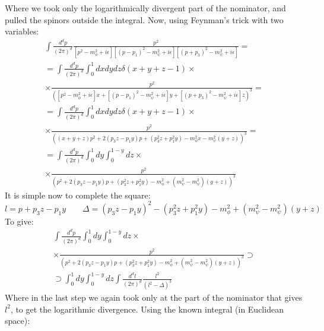 \documentclass{article}
\begin{document}
Where we took only the logarithmically divergent part of the nominator, and pulled the spinors outside the integral. Now, using Feynman's trick with two variables:
\begin{equation}
\begin{gathered}
    \int \frac{d^dp}{(2\pi)^d} \frac{p^2}{\left[p^2 - m_\phi^2 + i\epsilon\right]\left[(p - p_1)^2 - m_\psi^2 + i\epsilon\right]\left[(p + p_3)^2 - m_\psi^2 + i\epsilon\right]} = \\ =
    \int \frac{d^dp}{(2\pi)^d} \int_0^1 dxdydz \delta(x + y + z - 1) \times \\ \times \frac{p^2}{
        \left(
            \left[p^2 - m_\phi^2 + i\epsilon\right]x +
            \left[(p - p_1)^2 - m_\psi^2 + i\epsilon\right]y +
            \left[(p + p_3)^2 - m_\psi^2 + i\epsilon\right]z
        \right)^3
    } = \\ =
    \int \frac{d^dp}{(2\pi)^d} \int_0^1 dxdydz \delta(x + y + z - 1) \times \\ \times \frac{p^2}{
        \left(
            (x + y + z)p^2 + 2(p_3z - p_1y)p + (p_3^2z + p_1^2y)
             - m_\phi^2x - m_\psi^2(y + z)
        \right)^3
    } = \\ =
    \int \frac{d^dp}{(2\pi)^d} \int_0^1 dy \int _0^{1-y} dz \times \\ \times \frac{p^2}{
        \left(
            p^2 + 2(p_3z - p_1y)p + (p_3^2z + p_1^2y)
            - m_\phi^2 + (m_\psi^2 - m_\psi^2)(y + z)
        \right)^3
    }
\end{gathered}
\end{equation}
It is simple now to complete the square:
\begin{equation}
    l = p + p_3z - p_1y
    \qquad
    \Delta = (p_3z - p_1y)^2 - (p_3^2z + p_1^2y) - m_\phi^2 + (m_\psi^2 - m_\psi^2)(y + z)
\end{equation}
To give:
\begin{equation}
\begin{gathered}
    \int \frac{d^dp}{(2\pi)^d} \int_0^1 dy \int _0^{1-y} dz \times \\ \times \frac{p^2}{
        \left(
            p^2 + 2(p_3z - p_1y)p + (p_3^2z + p_1^2y)
            - m_\phi^2 + (m_\psi^2 - m_\psi^2)(y + z)
        \right)^3
    } \supset \\ \supset
    \int_0^1 dy \int _0^{1-y} dz \int \frac{d^dl}{(2\pi)^d} \frac{l^2}{\left(l^2 - \Delta\right)^3}
\end{gathered}
\end{equation}
Where in the last step we again took only at the part of the nominator that gives $l^2$, to get the logarithmic divergence. Using the known integral (in Euclidean space):
\end{document}
